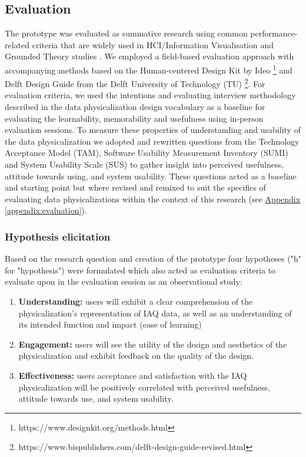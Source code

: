 \subsection{Evaluation}
\label{sec:evaluation}

The prototype was evaluated as summative research using common performance-related criteria that are widely used in HCI/Information Visualisation \cite{ranasinghe_encoding_2023} and Grounded Theory studies \cite{chun_tie_grounded_2019}. We employed a field-based evaluation approach with accompanying methods based on the Human-centered Design Kit by Ideo \footnote{https://www.designkit.org/methods.html} and Delft Design Guide from the Delft University of Technology (TU) \footnote{https://www.bispublishers.com/delft-design-guide-revised.html}. For evaluation criteria, we used the intentions and evaluating interview methodology described in the data physicalization design vocabulary \cite{jansen_evaluating_2013,ranasinghe_encoding_2023} as a baseline for evaluating the learnability, memorability and usefulness using in-person evaluation sessions. To measure these properties of understanding and usability of the data physicalization we adopted and rewritten questions from the Technology Acceptance Model (TAM), Software Usability Measurement Inventory (SUMI) and System Usability Scale (SUS) to gather insight into perceived usefulness, attitude towards using, and system usability\cite{davis_perceived_1989, brooke_sus_1996}. These questions acted as a baseline and starting point but where revised and remixed to suit the specifics of evaluating data physicalizations within the context of this research (see \hyperref[appendix:evaluation]{Appendix \ref*{appendix:evaluation}}).

\subsubsection{Hypothesis elicitation}

Based on the research question and creation of the prototype four hypotheses ("h" for "hypothesis") were formulated which also acted as evaluation criteria to evaluate upon in the evaluation session as an observational study:

\begin{enumerate}
    \renewcommand{\labelenumi}{H\arabic{enumi}:}
    \item \textbf{Understanding:} users will exhibit a clear comprehension of the physicalization's representation of IAQ data, as well as an understanding of its intended function and impact (ease of learning)
    \item \textbf{Engagement:} users will see the utility of the design and aesthetics of the physicalization and exhibit feedback on the quality of the design.
    \item \textbf{Effectiveness:} users acceptance and satisfaction with the IAQ physicalization will be positively correlated with perceived usefulness, attitude towards use, and system usability.
\end{enumerate}

